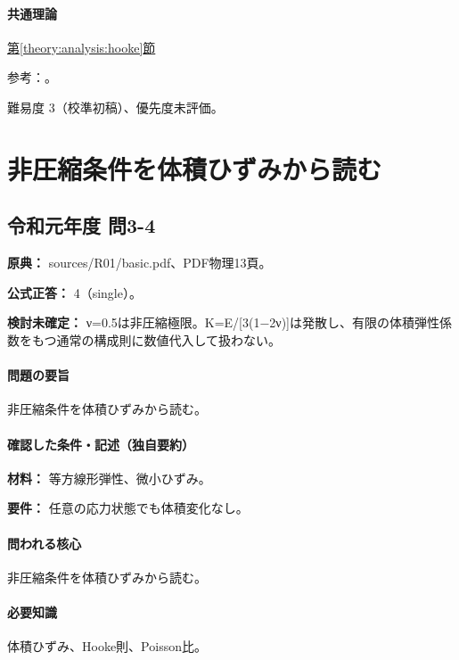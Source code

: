 \paragraph{共通理論} \hyperref[theory:analysis:hooke]{第\ref*{theory:analysis:hooke}節}

\par 参考：\cite{mit_material_elastic2000}。

\par 難易度 3（校準初稿）、優先度未評価。

\section{非圧縮条件を体積ひずみから読む}

\subsection{令和元年度 問3-4}
\label{q:r01-reg-basic-3-4}

\noindent\textbf{原典：} sources/R01/basic.pdf、PDF物理13頁。

\textbf{公式正答：} 4（single）。

\par\textbf{検討未確定：} ν=0.5は非圧縮極限。K=\allowbreak{}E/[3(1−2ν)]は発散し、有限の体積弾性係数をもつ通常の構成則に数値代入して扱わない。

\paragraph{問題の要旨} 非圧縮条件を体積ひずみから読む。

\paragraph{確認した条件・記述（独自要約）}\mbox{}\par

\noindent\textbf{材料：} 等方線形弾性、微小ひずみ。\par

\noindent\textbf{要件：} 任意の応力状態でも体積変化なし。\par

\paragraph{問われる核心} 非圧縮条件を体積ひずみから読む。

\paragraph{必要知識} 体積ひずみ、Hooke則、Poisson比。

